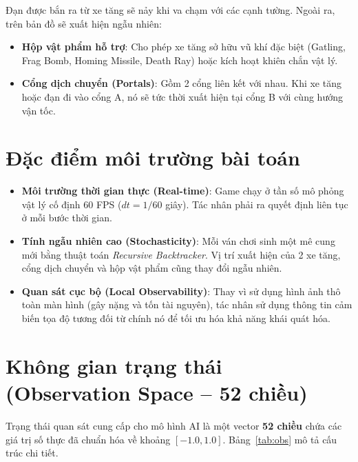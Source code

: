 \documentclass[a4paper, 12pt]{report}
\begin{document}
  Đạn được bắn ra từ xe tăng sẽ nảy khi va chạm với các cạnh tường. Ngoài ra, trên bản đồ sẽ xuất hiện ngẫu nhiên:
  \begin{itemize}
    \item \textbf{Hộp vật phẩm hỗ trợ}: Cho phép xe tăng sở hữu vũ khí đặc biệt (Gatling, Frag Bomb, Homing Missile, Death Ray) hoặc kích hoạt khiên chắn vật lý.
    \item \textbf{Cổng dịch chuyển (Portals)}: Gồm 2 cổng liên kết với nhau. Khi xe tăng hoặc đạn đi vào cổng A, nó sẽ tức thời xuất hiện tại cổng B với cùng hướng vận tốc.
  \end{itemize}

  \section{Đặc điểm môi trường bài toán}

  \begin{itemize}
    \item \textbf{Môi trường thời gian thực (Real-time)}: Game chạy ở tần số mô phỏng vật lý cố định 60 FPS ($dt = 1/60$ giây). Tác nhân phải ra quyết định liên tục ở mỗi bước thời gian.
    \item \textbf{Tính ngẫu nhiên cao (Stochasticity)}: Mỗi ván chơi sinh một mê cung mới bằng thuật toán \textit{Recursive Backtracker}. Vị trí xuất hiện của 2 xe tăng, cổng dịch chuyển và hộp vật phẩm cũng thay đổi ngẫu nhiên.
    \item \textbf{Quan sát cục bộ (Local Observability)}: Thay vì sử dụng hình ảnh thô toàn màn hình (gây nặng và tốn tài nguyên), tác nhân sử dụng thông tin cảm biến tọa độ tương đối từ chính nó để tối ưu hóa khả năng khái quát hóa.
  \end{itemize}

  \section{Không gian trạng thái (Observation Space -- 52 chiều)}

  Trạng thái quan sát cung cấp cho mô hình AI là một vector \textbf{52 chiều} chứa các giá trị số thực đã chuẩn hóa về khoảng $[-1.0, 1.0]$. Bảng~\ref{tab:obs} mô tả cấu trúc chi tiết.
\end{document}
